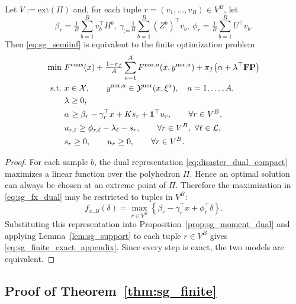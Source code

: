 \begin{proposition}
\label{prop:sg_finite_exact_appendix}
Let $V:=\mathrm{ext}(\Pi)$ and, for each tuple
$r=(v_1,\ldots,v_B)\in V^B$, let
\[
\beta_r=\tfrac{1}{B}\sum_{b=1}^B v_b^\top H^b, \ 
\gamma_:=\tfrac{1}{B}\sum_{b=1}^B (Z^b)^\top v_b, \ 
\phi_r=\tfrac{1}{B}\sum_{b=1}^B U^\top v_b.
\]
Then \eqref{eq:sg_semiinf} is equivalent to the finite optimization problem
\begin{equation}
\label{eq:sg_finite_exact_appendix}
\begin{aligned}
\min \ 
&F^{\mathrm{cons}}(x)
+\tfrac{1-\pi_f}{A}\sum_{a=1}^A F^{{\rm nor},a}(x,y^{{\rm nor},a})
+\pi_f\big(\alpha+\lambda^\top \mathbf{FP}\big)\\
\text{s.t.}\ 
&x\in \mathcal{X},\qquad y^{{\rm nor},a}\in \mathcal{Y}^{\mathrm{nor}}(x,\xi^a),\quad a=1,\ldots,A,\\
&\lambda\ge 0,\\
&\alpha\ge \beta_r-\gamma_r^\top x+Ks_r+\mathbf 1^\top u_r,
\qquad \forall r\in V^B,\\
&u_{r,\ell}\ge \phi_{r,\ell}-\lambda_\ell-s_r,
\qquad \forall r\in V^B,\ \forall \ell\in\mathcal L,\\
&s_r\ge 0,\qquad u_r\ge 0,
\qquad \forall r\in V^B.
\end{aligned}
\end{equation}
\end{proposition}

\begin{proof}
For each sample $b$, the dual representation \eqref{eq:disaster_dual_compact} maximizes a linear function over the
polyhedron $\Pi$. Hence an optimal solution can always be chosen at an extreme point of $\Pi$.
Therefore the maximization in \eqref{eq:sg_fx_dual} may be restricted to tuples in $V^B$:
\[
f_{x,B}(\delta)
=
\max_{r\in V^B}
\left\{\beta_r-\gamma_r^\top x+\phi_r^\top\delta\right\}.
\]
Substituting this representation into Proposition~\ref{prop:sg_moment_dual} and applying
Lemma~\ref{lem:sg_support} to each tuple $r\in V^B$ gives \eqref{eq:sg_finite_exact_appendix}.
Since every step is exact, the two models are equivalent.
\end{proof}

\subsection{Proof of Theorem~\ref{thm:sg_finite}}

